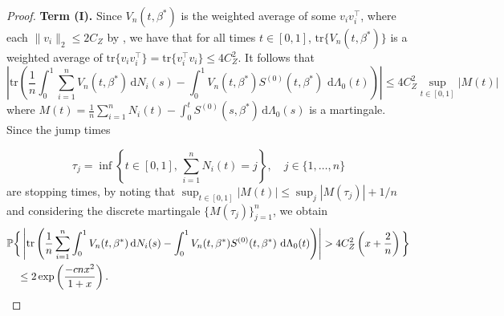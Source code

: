 \documentclass[11pt]{article}
\newcommand{\dint}{\,\mathrm{d}}
\begin{document}
\begin{proof}
\bigskip
\noindent \textbf{Term (I).}  Since $V_n(t, \beta^*)$ is the weighted average of some $v_i v_i^\top$, where each $\|v_i\|_2 \leq 2C_Z$ by , we have that for all times $t \in [0, 1]$, $\mathrm{tr}\{V_n(t, \beta^*)\}$ is a weighted average of $\mathrm{tr}\{v_i v_i^\top\} = \mathrm{tr}\{v_i^\top v_i\} \leq 4C_Z^2$. It follows that  
\begin{equation*}
    \left| \mathrm{tr} \left(\frac{1}{n}\int_0^{1}\sum_{i=1}^nV_n(t, \beta^*) \dint N_i(s)- \int_0^{1} V_n(t, \beta^*) S^{(0)}(t, \beta^*)\, \dint \Lambda_0(t) \right)\right| \leq 4C_Z^2  \sup_{t\in [0, 1]} |M(t)|
\end{equation*}
where $M(t) = \frac{1}{n}\sum_{i=1}^n N_i(t) - \int_0
^t S^{(0)}(s, \beta^*) \dint \Lambda_0(s)$ is a martingale. Since the jump times 

\begin{equation*}
    \tau_j = \inf \left\{t \in [0, 1], \,\sum_{i=1}^n N_i(t)=j \right\}, \quad j \in \{1, \dots, n\}
\end{equation*}
are stopping times, by noting that $\sup_{t \in [0, 1]} |M(t)| \leq \sup_{j} |M(\tau_j)| + 1/n$ and considering the discrete martingale $\{M(\tau_j)\}_{j=1}^n$, we obtain 
\begin{align}
    & \mathbb{P} \bigg\{\left| \mathrm{tr} \left(\frac{1}{n}\sum_{i=1}^n \int_0^{1} V_n(t, \beta^*) \dint N_i(s)- \int_0^{1} V_n(t, \beta^*) S^{(0)}(t, \beta^*)\, \dint \Lambda_0(t) \right)\right| > 4C_Z^2 \left(x+ \frac{2}{n} \right) \bigg\} \notag\\
    &\quad \leq 2 \exp \left(\frac{-cnx^2}{1+x} \right). \label{eq:hessian_1}
\end{align}
    


\end{proof}
\end{document}
